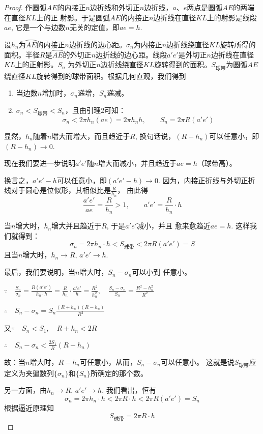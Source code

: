 \begin{proof}
作圆弧$AE$的内接正$n$边折线和外切正$n$边折线，$a$、$e$两点是圆弧$AE$的两端在直径$KL$上的正
射影。于是圆弧$AE$的内接正$n$边折线在直径$KL$上的射影是线段$ae$, 它是一个与边数$n$无关的定值，即$ae=h$.

设$h_n$为$\wideparen{AE}$的内接正$n$边折线的边心距。$\sigma_n$为内接正$n$边折线绕直径$KL$旋转所得的面积。半径$R$是$\wideparen{AE}$的外切正$n$边折线的边心距。线段$a'e'$是外切正$n$边折线在直径$KL$上的正射影。$S_n$ 为外切正$n$边折线绕直径$KL$旋转得到的面积。$S_{\text{球带}}$为圆弧$AE$绕直径$KL$旋转得到的球带面积。根据几何直观，我们得到
\begin{enumerate}
\item 当边数$n$增加时，$\sigma_n$递增，$S_n$递减。
\item $\sigma_n<S_{\text{球带}}<S_n$，且由引理2可知：
\[\sigma_n<2\pi h_n(ae)=2\pi h_n h,\qquad S_n =2\pi R (a'e')\]    
\end{enumerate}

显然，$h_n$随着$n$增大而增大，而且趋近于$R$, 换句话说，$(R-h_n)$可以任意小，即$(R-h_n)\to 0$. 

现在我们要进一步说明$a'e'$随$n$增大而减小，并且趋近于$ae=h$（球带高）。

换言之，$a'e'-h$可以任意小，即$(a'e'-h)\to 0$. 因为，内接正折线与外切正折线对于圆心是位似形，其相似比是$\frac{R}{h_n}$，
由此得
\[\frac{a'e'}{ae}=\frac{R}{h_n}>1,\qquad a'e'=\frac{R}{h_n}\cdot h\]

当$n$增大时，$h_n$增大并且趋近于$R$, 于是$a'e'$减小，并且
愈来愈趋近$ae=h$. 这样我们就得到：
\[\sigma_n=2\pi h_n\cdot h<S_{\text{球带}}<2\pi R(a'e')=S\]
且当$n$增大时，$h_n\to R$, $a'e'\to h$.

最后，我们要说明，当$n$增大时，$S_n-\sigma_n$可以小到
任意小。

$\because\quad \frac{S_n}{\sigma_n}=\frac{R(a'e')}{h_n\cdot h}=\frac{R}{h_n}\cdot \frac{a'e'}{h}=\frac{R^2}{h^2_n},\quad \frac{S_n-\sigma_n}{S_n}=\frac{R^2-h^2_n}{R^2}$

$\therefore\quad S_n-\sigma_n=S_n\frac{(R+h_n) (R-h_n)}{R^2}$

又$\because\quad S_n<S_1,\quad R+h_n<2R$

$\therefore\quad S_n-\sigma_n<\frac{2S_1}{R}(R-h_n)$

故：当$n$增大时，$R-h_n$可任意小，从而，$S_n -\sigma_n$可以任意小。
这就是说$S_{\text{球带}}$应定义为夹逼数列$\{\sigma_n\}$和$\{S_n \}$所确定的那个数。

另一方面，由$h_n\to R$, $a'e'\to h$, 我们看出，恒有
\[\sigma_n=2\pi h_n\cdot h<2\pi R\cdot h<2\pi R (a'e') =S_n\]
根据逼近原理知
$$S_{\text{球带}}=2\pi R\cdot h$$
\end{proof}

